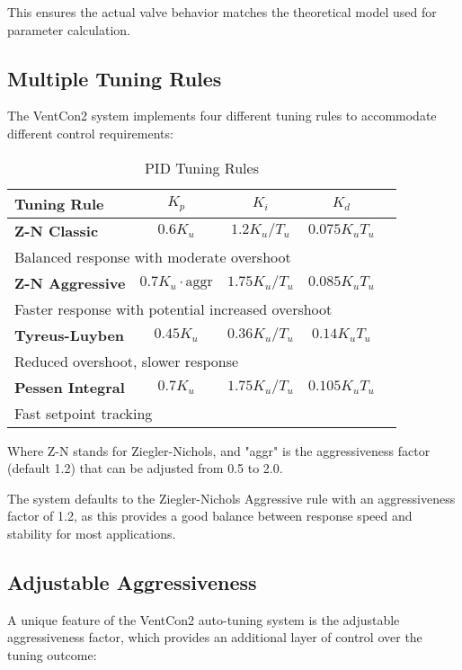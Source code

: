 \documentclass[a4paper,11pt]{article}
\begin{document}
This ensures the actual valve behavior matches the theoretical model used for parameter calculation.

\subsection{Multiple Tuning Rules}

The VentCon2 system implements four different tuning rules to accommodate different control requirements\cite{wiki:pidtuning}:

\begin{table}[ht]
\centering
\caption{PID Tuning Rules\cite{ni:pidtuning}}
\begin{tabular}{lcccp{3.6cm}}
\toprule
\textbf{Tuning Rule} & \textbf{$K_p$} & \textbf{$K_i$} & \textbf{$K_d$}  \\
\midrule
\textbf{Z-N Classic} \cite{ziegler1942optimum} & $0.6K_u$ & $1.2K_u/T_u$ & $0.075K_uT_u$   \\
\multicolumn{4}{l}{Balanced response with moderate overshoot} \\
\textbf{Z-N Aggressive} & $0.7K_u \cdot \text{aggr}$ & $1.75K_u/T_u$ & $0.085K_uT_u$  \\
\multicolumn{4}{l}{Faster response with potential increased overshoot} \\
\textbf{Tyreus-Luyben} \cite{tyreus1992tuning} & $0.45K_u$ & $0.36K_u/T_u$ & $0.14K_uT_u$  \\
\multicolumn{4}{l}{Reduced overshoot, slower response} \\
\textbf{Pessen Integral} \cite{pessen1954new} & $0.7K_u$ & $1.75K_u/T_u$ & $0.105K_uT_u$  \\
\multicolumn{4}{l}{Fast setpoint tracking} \\
\bottomrule
\end{tabular}
\end{table}

Where Z-N stands for Ziegler-Nichols, and "aggr" is the aggressiveness factor (default 1.2) that can be adjusted from 0.5 to 2.0.

The system defaults to the Ziegler-Nichols Aggressive rule with an aggressiveness factor of 1.2, as this provides a good balance between response speed and stability for most applications.

\subsection{Adjustable Aggressiveness}

A unique feature of the VentCon2 auto-tuning system is the adjustable aggressiveness factor, which provides an additional layer of control over the tuning outcome:
\end{document}
